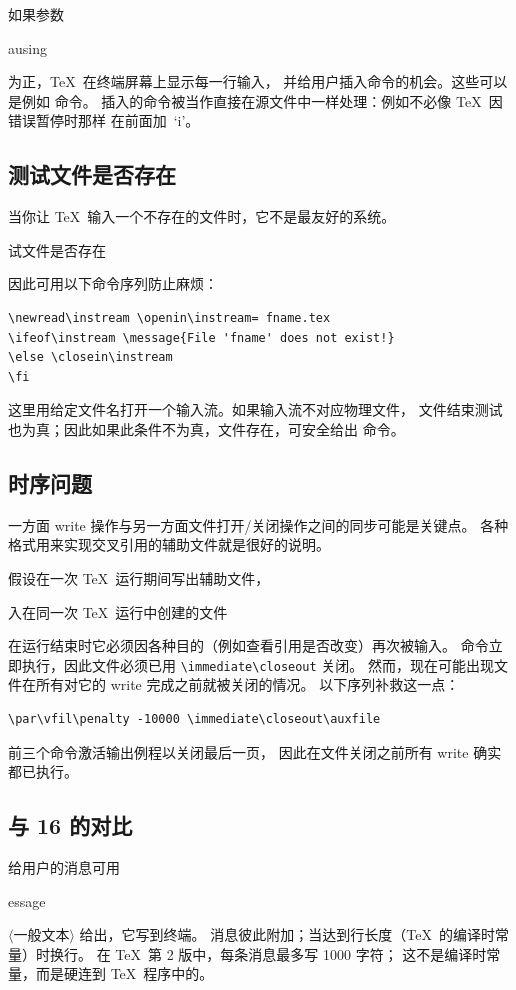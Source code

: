 \documentclass[a4paper]{rapport3}
\makeatletter
\def\gr#1{$\langle$#1$\rangle$}\def\key#1{{\tt#1}}
\def\howto#1\par{}
\def\cstoidx#1\par{\index{#1@\cs{#1}}}
\def\csidx#1{\cstoidx #1\par\cs{#1}}
\makeatother
\begin{document}
如果参数 \csidx{pausing} 为正，\TeX\ 在终端屏幕上显示每一行输入，
并给用户插入命令的机会。这些可以是例如  命令。
插入的命令被当作直接在源文件中一样处理：例如不必像 \TeX\ 因错误暂停时那样
在前面加~`i'。

\subsection{测试文件是否存在}

当你让 \TeX\ 输入一个不存在的文件时，它不是最友好的系统。
\howto 测试文件是否存在\par
因此可用以下命令序列防止麻烦\label{ex:eof}：
\begin{verbatim}
\newread\instream \openin\instream= fname.tex
\ifeof\instream \message{File 'fname' does not exist!}
\else \closein\instream 
\fi
\end{verbatim}
这里用给定文件名打开一个输入流。如果输入流不对应物理文件，
文件结束测试也为真；因此如果此条件不为真，文件存在，可安全给出  命令。

\subsection{时序问题}

一方面 write 操作与另一方面文件打开/关闭操作之间的同步可能是关键点。
各种格式用来实现交叉引用的辅助文件就是很好的说明。

假设在一次 \TeX\ 运行期间写出辅助文件，
\howto 输入在同一次 \TeX\ 运行中创建的文件\par
在运行结束时它必须因各种目的（例如查看引用是否改变）再次被输入。
 命令立即执行，因此文件必须已用 \verb=\immediate\closeout= 关闭。
然而，现在可能出现文件在所有对它的 write 完成之前就被关闭的情况。
以下序列补救这一点：
\begin{verbatim}
\par\vfil\penalty -10000 \immediate\closeout\auxfile
\end{verbatim}
前三个命令激活输出例程以关闭最后一页，
因此在文件关闭之前所有 write 确实都已执行。

\subsection{ 与 16 的对比}

给用户的消息可用 \csidx{message}\gr{一般文本} 给出，它写到终端。
消息彼此附加；当达到行长度（\TeX\ 的编译时常量）时换行。
在 \TeX\ 第 2 版中，每条消息最多写 1000 字符；
这不是编译时常量，而是硬连到 \TeX\ 程序中的。
\end{document}
